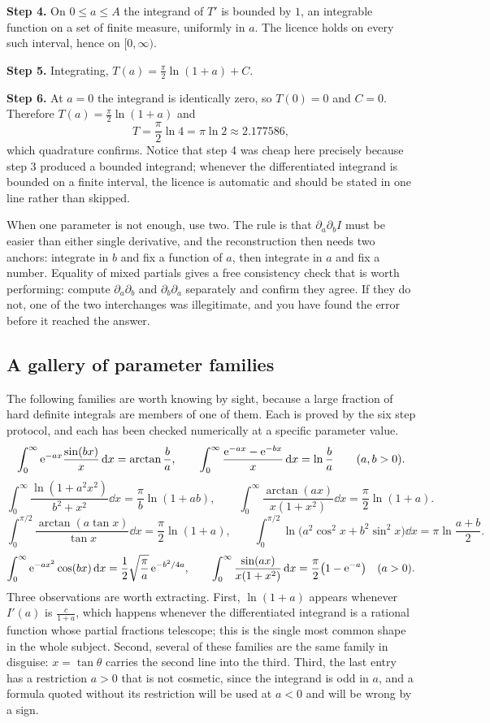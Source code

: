 \textbf{Step 4.} On $0\leq a\leq A$ the integrand of $T'$ is bounded by $1$, an integrable function on a set of finite measure, uniformly in $a$. The licence holds on every such interval, hence on $[0,\infty)$.

\textbf{Step 5.} Integrating, $T(a)=\frac{\pi}{2}\ln(1+a)+C$.

\textbf{Step 6.} At $a=0$ the integrand is identically zero, so $T(0)=0$ and $C=0$. Therefore $T(a)=\frac{\pi}{2}\ln(1+a)$ and
\[T=\frac{\pi}{2}\ln4=\pi\ln2\approx2.177586,\]
which quadrature confirms. Notice that step 4 was cheap here precisely because step 3 produced a bounded integrand; whenever the differentiated integrand is bounded on a finite interval, the licence is automatic and should be stated in one line rather than skipped.

\begin{keynote}
When one parameter is not enough, use two. The rule is that $\partial_a\partial_b I$ must be easier than either single derivative, and the reconstruction then needs two anchors: integrate in $b$ and fix a function of $a$, then integrate in $a$ and fix a number. Equality of mixed partials gives a free consistency check that is worth performing: compute $\partial_a\partial_b$ and $\partial_b\partial_a$ separately and confirm they agree. If they do not, one of the two interchanges was illegitimate, and you have found the error before it reached the answer.
\end{keynote}

\subsection{A gallery of parameter families}

The following families are worth knowing by sight, because a large fraction of hard definite integrals are members of one of them. Each is proved by the six step protocol, and each has been checked numerically at a specific parameter value.
\[\int_0^{\infty}\mathrm{e}^{-ax}\frac{\sin(bx)}{x}\,\mathrm{d} x=\arctan\frac{b}{a},\qquad \int_0^{\infty}\frac{\mathrm{e}^{-ax}-\mathrm{e}^{-bx}}{x}\,\mathrm{d} x=\ln\frac{b}{a}\qquad(a,b>0).\]
\[\int_0^{\infty}\frac{\ln(1+a^{2}x^{2})}{b^{2}+x^{2}}\dd x=\frac{\pi}{b}\ln(1+ab),\qquad \int_0^{\infty}\frac{\arctan(ax)}{x(1+x^{2})}\dd x=\frac{\pi}{2}\ln(1+a).\]
\[\int_0^{\pi/2}\frac{\arctan(a\tan x)}{\tan x}\dd x=\frac{\pi}{2}\ln(1+a),\qquad \int_0^{\pi/2}\ln\bigl(a^{2}\cos^{2}x+b^{2}\sin^{2}x\bigr)\dd x=\pi\ln\frac{a+b}{2}.\]
\[\int_0^{\infty}\mathrm{e}^{-ax^{2}}\cos(bx)\,\mathrm{d} x=\frac12\sqrt{\frac{\pi}{a}}\,\mathrm{e}^{-b^{2}/4a},\qquad \int_0^{\infty}\frac{\sin(ax)}{x(1+x^{2})}\,\mathrm{d} x=\frac{\pi}{2}\bigl(1-\mathrm{e}^{-a}\bigr)\quad(a>0).\]
Three observations are worth extracting. First, $\ln(1+a)$ appears whenever $I'(a)$ is $\frac{c}{1+a}$, which happens whenever the differentiated integrand is a rational function whose partial fractions telescope; this is the single most common shape in the whole subject. Second, several of these families are the same family in disguise: $x=\tan\theta$ carries the second line into the third. Third, the last entry has a restriction $a>0$ that is not cosmetic, since the integrand is odd in $a$, and a formula quoted without its restriction will be used at $a<0$ and will be wrong by a sign.

